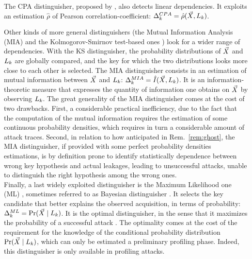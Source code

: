 The CPA distinguisher, proposed by \cite{brier2004correlation}, also detects linear dependencies. It exploits an estimation $\hat{\rho}$ of Pearson correlation-coefficient: $\Delta^{CPA}_{k} = \hat{\rho}(\vec{X}, L_k )$.


Other kinds of more general distinguishers (\eg the Mutual Information Analysis (MIA) \cite{gierlichs2008mutual,batina2011mutual} and the Kolmogorov-Smirnov test-based ones \cite{veyrat2009mutual}) look for a wider range of dependencies. With the KS distinguisher, the probability distributions of $\vec{X}$ and $L_k$ are globally compared, and the key for which the two distributions looks more close to each other is selected. The MIA distinguisher consists in an estimation of mutual information between $\vec{X}$ and $L_k$: $\Delta^{MIA}_{k} = \hat{I}(\vec{X}, L_k )$. It is an information-theoretic measure that expresses the quantity of information one obtains on $\vec{X}$ by observing $L_k$. The great generality of the MIA distinguisher comes at the cost of two drawbacks. First, a considerable practical inefficiency, due to the fact that the computation of the mutual information requires the estimation of some continuous probability densities, which requires in turn a considerable amount of attack traces. Second, in relation to how anticipated in Rem.~\ref{rem:ghost}, the MIA distinguisher, if provided with some perfect probability densities estimations, is by definition prone to identify statistically dependence between wrong key hypothesis and actual leakages, leading to unsuccessful attacks, unable to distinguish the right hypothesis among the wrong ones.  \\

Finally, a last widely exploited distinguisher is the Maximum Likelihood one (ML) \cite{Chari2003}, sometimes referred to as Bayesian distinguisher \cite{mangard2011one}. It selects the key candidate that better explains the observed acquisition, in terms of probability: $\distinguisher^{ML}_{\keyVar} = \prob(\given{\vaLeakVec}{\leakageModel_\keyVar})$.  It is the optimal distinguisher, in the sense that it maximizes the probability of a successful attack \cite{heuser2014good}. The optimality comes at the cost of the requirement for the knowledge of the conditional probability distribution $\prob(\given{\vaLeakVec}{\leakageModel_\keyVar})$, which can only be estimated \via a preliminary profiling phase. Indeed, this distinguisher is only available in profiling attacks.\\

